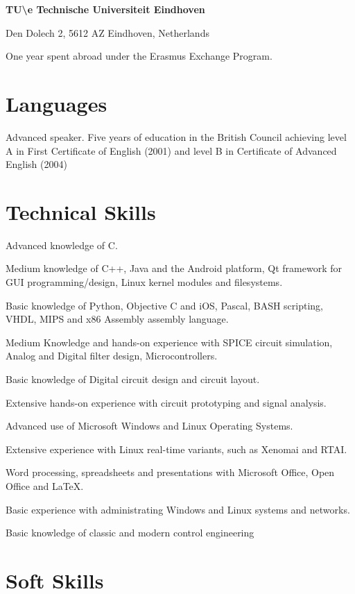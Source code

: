 {
\textbf{TU\textbackslash e Technische Universiteit Eindhoven}

Den Dolech 2, 5612 AZ Eindhoven, Netherlands
}
{
One year spent abroad under the Erasmus Exchange Program.
}

\section*{Languages}

{
Advanced speaker. Five years of education in the British Council achieving
level A in First Certificate of English (2001) and level B in Certificate of
Advanced English (2004)
}


\section*{Technical Skills}

{
Advanced knowledge of C.
			
Medium knowledge of C++, Java and the Android platform, Qt framework for GUI
programming/design, Linux kernel modules and filesystems.
			
Basic knowledge of Python, Objective C and iOS, Pascal, BASH scripting, VHDL,
MIPS and x86 Assembly assembly language.
}
{
Medium Knowledge and hands-on experience with SPICE circuit simulation, Analog
and Digital filter design, Microcontrollers.
			 
Basic knowledge of Digital circuit design and circuit layout.

Extensive hands-on experience with circuit prototyping and signal analysis.
}
{
Advanced use of Microsoft Windows and Linux Operating Systems.

Extensive experience with Linux real-time variants, such as Xenomai and RTAI.

Word processing, spreadsheets and presentations with Microsoft Office, Open
Office and \LaTeX.

Basic experience with administrating Windows and Linux systems and networks.

Basic knowledge of classic and modern control engineering
}


\section*{Soft Skills}

